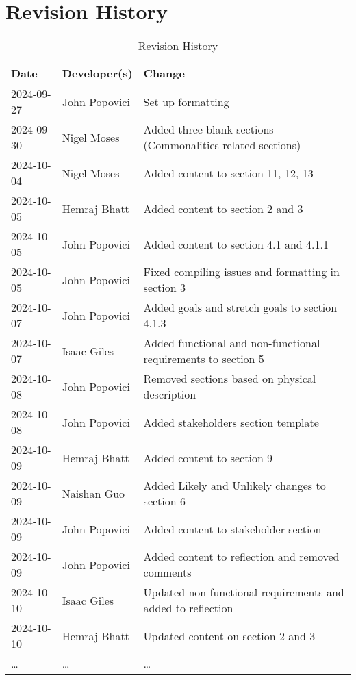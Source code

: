 \section*{Revision History}

\begin{table}[hp]
\caption{Revision History} \label{TblRevisionHistory}
\begin{tabularx}{\textwidth}{llX}
\toprule
\textbf{Date} & \textbf{Developer(s)} & \textbf{Change}\\
\midrule
2024-09-27 & John Popovici & Set up formatting\\
2024-09-30 & Nigel Moses & Added three blank sections (Commonalities related sections)\\
2024-10-04 & Nigel Moses & Added content to section 11, 12, 13\\
2024-10-05 & Hemraj Bhatt & Added content to section 2 and 3\\
2024-10-05 & John Popovici & Added content to section 4.1 and 4.1.1\\
2024-10-05 & John Popovici & Fixed compiling issues and formatting in section 3\\
2024-10-07 & John Popovici & Added goals and stretch goals to section 4.1.3\\
2024-10-07 & Isaac Giles & Added functional and non-functional requirements to section 5\\
2024-10-08 & John Popovici & Removed sections based on physical description\\
2024-10-08 & John Popovici & Added stakeholders section template\\
2024-10-09 & Hemraj Bhatt & Added content to section 9\\
2024-10-09 & Naishan Guo & Added Likely and Unlikely changes to section 6\\
2024-10-09 & John Popovici & Added content to stakeholder section\\
2024-10-09 & John Popovici & Added content to reflection and removed comments\\
2024-10-10 & Isaac Giles & Updated non-functional requirements and added to reflection\\
2024-10-10 & Hemraj Bhatt & Updated content on section 2 and 3\\
\dots & \dots & \dots\\
\bottomrule
\end{tabularx}
\end{table}

